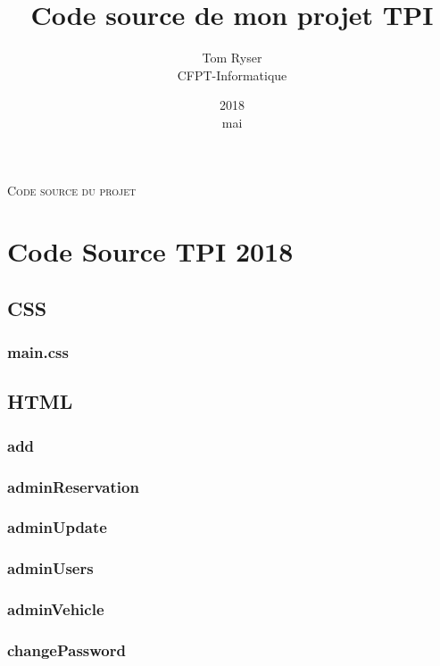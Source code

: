 \documentclass[a4paper,12pt]{report}
\title{Code source de mon projet TPI}
\date{2018\\ mai}
\author{Tom Ryser\\ CFPT-Informatique}
\begin{document}
\maketitle
\begin{center}
	\textsc{Code source du projet}
\end{center}

\tableofcontents

\chapter{Code Source TPI 2018}


\section{CSS}

\subsection{main.css}


\section{HTML}

\subsection{add}

\subsection{adminReservation}

\subsection{adminUpdate}

\subsection{adminUsers}

\subsection{adminVehicle}

\subsection{changePassword}

\end{document}
